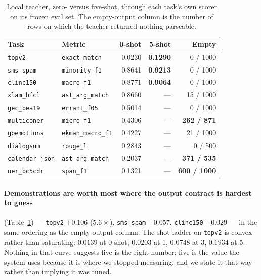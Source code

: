\documentclass[sigconf,10pt]{acmart}
\newcommand{\tsk}[1]{\texttt{#1}}
\begin{document}
\begin{table}[t]
\centering
\small
\caption{Local teacher, zero- versus five-shot, through each task's own scorer on its frozen
eval set. The empty-output column is the number of rows on which the teacher returned nothing
parseable.}
\label{tab:fewshot}
\begin{tabular}{@{}llrrr@{}}
\toprule
Task & Metric & 0-shot & 5-shot & Empty \\
\midrule
\tsk{topv2}          & \tsk{exact\_match}    & 0.0230 & \textbf{0.1290} & 0 / 1000 \\
\tsk{sms\_spam}      & \tsk{minority\_f1}    & 0.8641 & \textbf{0.9213} & 0 / 1000 \\
\tsk{clinc150}       & \tsk{macro\_f1}       & 0.8771 & \textbf{0.9064} & 0 / 1000 \\
\tsk{xlam\_bfcl}     & \tsk{ast\_arg\_match} & 0.8660 & --- & 15 / 1000 \\
\tsk{gec\_bea19}     & \tsk{errant\_f05}     & 0.5014 & --- & 0 / 1000 \\
\tsk{multiconer}     & \tsk{micro\_f1}       & 0.4306 & --- & \textbf{262 / 871} \\
\tsk{goemotions}     & \tsk{ekman\_macro\_f1}& 0.4227 & --- & 21 / 1000 \\
\tsk{dialogsum}      & \tsk{rouge\_l}        & 0.2843 & --- & 0 / 500 \\
\tsk{calendar\_json} & \tsk{ast\_arg\_match} & 0.2037 & --- & \textbf{371 / 535} \\
\tsk{ner\_bc5cdr}    & \tsk{span\_f1}        & 0.1321 & --- & \textbf{600 / 1000} \\
\bottomrule
\end{tabular}
\end{table}

\paragraph{Demonstrations are worth most where the output contract is hardest to guess}
(Table~\ref{tab:fewshot}) ---
\tsk{topv2} $+0.106$ ($5.6\times$), \tsk{sms\_spam} $+0.057$, \tsk{clinc150} $+0.029$ --- in
the same ordering as the empty-output column. The shot ladder on \tsk{topv2} is convex rather
than saturating: $0.0139$ at 0-shot, $0.0203$ at 1, $0.0748$ at 3, $0.1934$ at 5. Nothing
in that curve suggests five is the right number; five is the value the system uses because it
is where we stopped measuring, and we state it that way rather than implying it was tuned.
\end{document}
